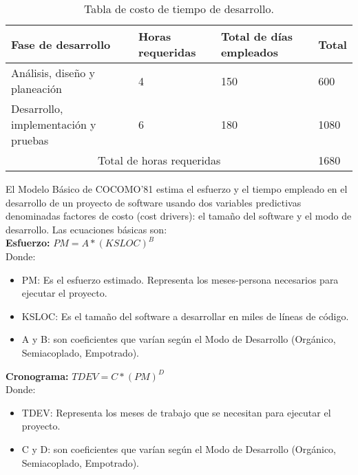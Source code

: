 	\begin{table}[htbp]
		\begin{center}
			\begin{tabular}{|p{20mm}|p{30mm}|p{15mm}|p{15mm}|}
				\hline
				\textbf{Fase de desarrollo}  & \textbf{Horas requeridas} & \textbf{Total de días empleados} & \textbf{Total} \\ \hline 
				Análisis, diseño y planeación & 4 & 150 & 600 \\ \hline
				
				Desarrollo, implementación y pruebas & 6 & 180 & 1080 \\ \hline
				
				\multicolumn{3}{|c|}{Total de horas requeridas} & 1680\\ \hline
			\end{tabular}
			\caption{Tabla de costo de tiempo de desarrollo.}
			\label{tablacostodesarrollo}
		\end{center}
	\end{table}
	
	\noindent El Modelo Básico de COCOMO’81 estima el esfuerzo y el tiempo empleado en el desarrollo
	de un proyecto de software usando dos variables predictivas denominadas factores de costo (cost
	drivers): el tamaño del software y el modo de desarrollo. Las ecuaciones básicas son: \\
	\textbf{Esfuerzo:}
	$PM = A * (KSLOC)^{B} $\\
	
	\noindent Donde: 
	\begin{itemize}
		\item PM: Es el esfuerzo estimado. Representa los meses-persona necesarios para ejecutar el proyecto.
		\item KSLOC: Es el tamaño del software a desarrollar en miles de líneas de código.
		\item A y B: son coeficientes que varían según el Modo de Desarrollo (Orgánico, Semiacoplado, Empotrado).
	\end{itemize}
	
	\textbf{Cronograma:}
	$TDEV = C * (PM)^{D} $\\
	\noindent Donde: 
	\begin{itemize}
		\item TDEV: Representa los meses de trabajo que se necesitan para ejecutar el proyecto.
		\item C y D: son coeficientes que varían según el Modo de Desarrollo (Orgánico, Semiacoplado, Empotrado).
	\end{itemize}
	
